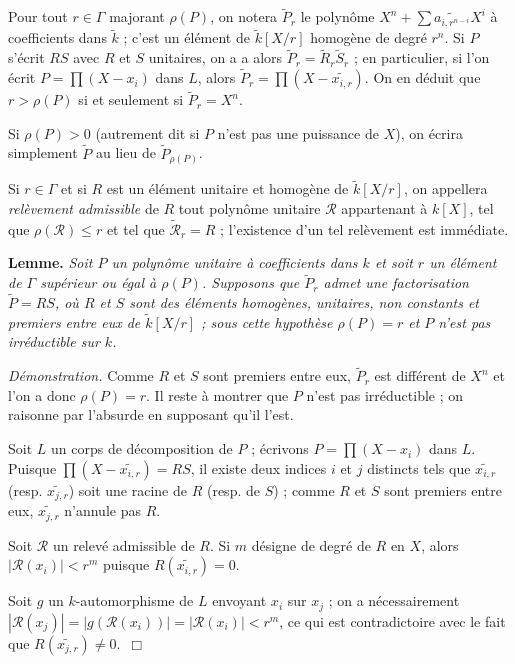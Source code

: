 \documentclass[10pt,leqno]{article}
\renewcommand{\leq}{\leqslant}
\renewcommand{\cal}{\mathscr}
\newcommand{\red}{\widetilde}
\newcommand{\deux}[1]{\refstepcounter{subsection}\label{#1}\medskip\noindent {\bf (\thesubsection)}\hspace{.1cm}}
\begin{document}
\medskip
Pour tout $r\in \Gamma$ majorant $\rho(P)$, on notera $\red{P}_{r}$ le polynôme $X^{n}+\sum \widetilde{a_{i,r^{n-i}}}X^{i}$ à coefficients dans $\red{k}$ ; c'est un élément de $\red{k}[X/r]$ homogène de degré $r^{n}$. Si $P$ s'écrit $RS$ avec $R$ et $S$ unitaires, on a a alors $\red{P}_{r}=\red{R}_{r}\red{S}_{r}$ ; en particulier, si l'on écrit $P=\prod (X-x_{i})$ dans $L$, alors $\red{P}_{r}=\prod (X-\widetilde{x_{i,r}})$. On en déduit que $r>\rho(P)$ si et seulement si $\red{P}_{r}=X^{n}$.

\medskip
Si $\rho(P)>0$ (autrement dit si $P$ n'est pas une puissance de $X$), on écrira simplement $\red{P}$ au lieu de $\red{P}_{\rho(P)}$.  

\medskip
Si $r\in \Gamma$ et si $R$ est un élément unitaire et homogène de $\red{k}[X/r]$, on appellera {\em relèvement admissible} de $R$ tout polynôme unitaire $\cal R$ appartenant à $k[X]$, tel que $\rho({\cal R})\leq r$ et tel que $\red{\cal R}_{r}=R$ ; l'existence d'un tel relèvement est immédiate. 

\medskip
\deux{prehensel} {\bf Lemme.} {\em Soit $P$ un polynôme unitaire à coefficients dans $k$ et soit $r$ un élément de $\Gamma$ supérieur ou égal à $\rho(P)$. Supposons que $\red{P}_{r}$ admet une factorisation $\red{P}=RS$, où $R$ et $S$ sont des éléments homogènes, unitaires, non constants et {\em premiers entre eux} de $\red{k}[X/r]$ ; sous cette hypothèse $\rho(P)=r$ et $P$ n'est pas irréductible sur $k$.} 

\medskip
{\em Démonstration.} Comme $R$ et $S$ sont premiers entre eux, $\red{P}_{r}$ est différent de $X^{n}$ et l'on a donc $\rho(P)=r$. Il reste à montrer que $P$ n'est pas irréductible ; on raisonne par l'absurde en supposant qu'il l'est. 

\medskip
Soit $L$ un corps de décomposition de $P$ ; écrivons $P=\prod (X-x_{i})$ dans $L$. Puisque $\prod(X-\widetilde{x_{i,r}})=RS$, il existe deux indices $i$ et $j$ distincts tels que $\widetilde{x_{i,r}}$ (resp. $\widetilde{x_{j,r}}$) soit une racine de $R$ (resp. de $S$) ; comme $R$ et $S$ sont premiers entre eux, $\widetilde{x_{j,r}}$ n'annule pas $R$. 

\medskip
Soit $\cal R$ un relevé admissible de $R$. Si $m$ désigne de degré de $R$ en $X$, alors $|{\cal R}(x_{i})|<r^{m}$ puisque $R(\widetilde{x_{i,r}})=0$. 

\medskip
Soit $g$ un $k$-automorphisme de $L$ envoyant $x_{i}$ sur $x_{j}$ ; on a nécessairement $|{\cal R}(x_{j})|=|g({\cal R}(x_{i}))|=|{\cal R}(x_{i})|<r^{m}$, ce qui est contradictoire avec le fait que $R(\widetilde{x_{j,r}})\neq 0$.~$\Box$ 
\end{document}
